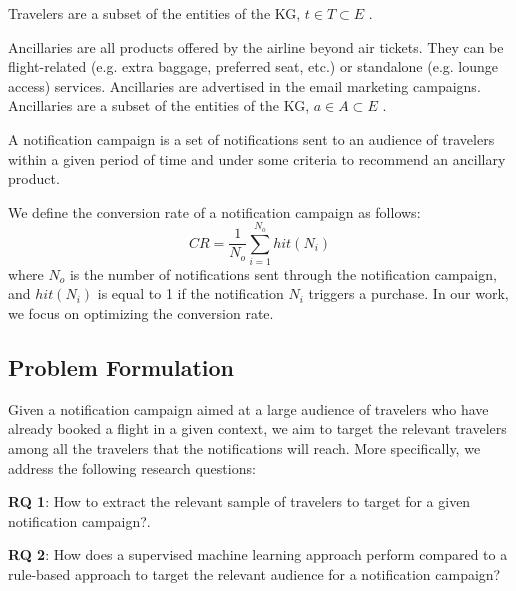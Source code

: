 \documentclass[11pt,dvipdfm]{article}
\begin{document}
\begin{definition}
\label{def:Travelers}
Travelers are a subset of the entities of the KG, $t \in T \subset E$ .
\end{definition}

\begin{definition}
\label{def:Ancillaries}
Ancillaries are all products offered by the airline beyond air tickets. They can be flight-related (e.g. extra baggage, preferred seat, etc.) or standalone (e.g. lounge access) services. Ancillaries are advertised in the email marketing campaigns. Ancillaries are a subset of the entities of the KG, $a \in A \subset E$ .
\end{definition}

\begin{definition}
\label{def:Notification}
A notification campaign is a set of notifications sent to an audience of travelers within a given period of time and under some criteria to recommend an ancillary product. 
\end{definition}

\begin{definition}
\label{def:CR}
We define the conversion rate of a notification campaign as follows:
\begin{equation}
\label{eq:CR}
CR = \frac{1}{N_{o}} \sum_{i=1}^{N_o} hit(N_{i}) 
\end{equation}
where $N_{o}$ is the number of notifications sent through the notification campaign, and $hit(N_{i})$ is equal to 1 if the notification $N_{i}$ triggers a purchase. In our work, we focus on optimizing the conversion rate.
\end{definition}

\subsection{Problem Formulation}
\label{sec:pb-formulation}
Given a notification campaign aimed at a large audience of travelers who have already booked a flight in a given context, we aim to target the relevant travelers among all the travelers that the notifications will reach. More specifically, we address the following research questions:

\textbf{RQ 1}: How to extract the relevant sample of travelers to target for a given notification campaign?.

\textbf{RQ 2}: How does a supervised machine learning approach perform compared to a rule-based approach to target the relevant audience for a notification campaign?
\end{document}
